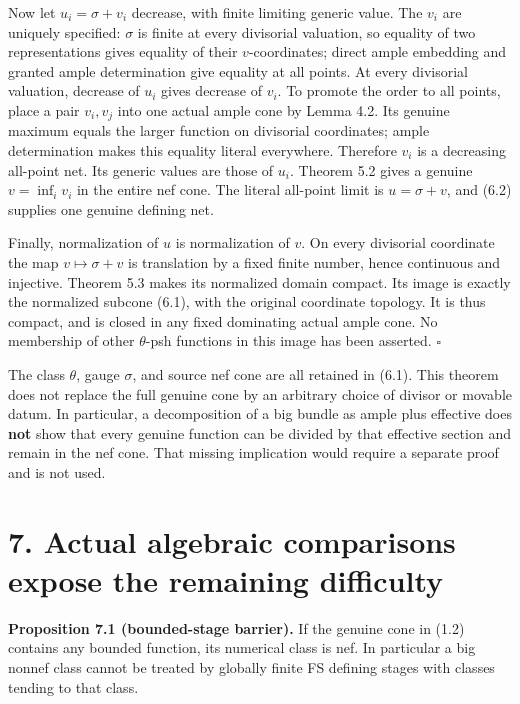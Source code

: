 \documentclass[10pt]{article}
\begin{document}
Now let \(u_i=\sigma+v_i\) decrease, with finite limiting generic value.
The \(v_i\) are uniquely specified: \(\sigma\) is finite at every
divisorial valuation, so equality of two representations gives equality
of their \(v\)-coordinates; direct ample embedding and granted ample
determination give equality at all points. At every divisorial
valuation, decrease of \(u_i\) gives decrease of \(v_i\). To promote the
order to all points, place a pair \(v_i,v_j\) into one actual ample cone
by Lemma 4.2. Its genuine maximum equals the larger function on
divisorial coordinates; ample determination makes this equality literal
everywhere. Therefore \(v_i\) is a decreasing all-point net. Its generic
values are those of \(u_i\). Theorem 5.2 gives a genuine
\(v=\inf_i v_i\) in the entire nef cone. The literal all-point limit is
\(u=\sigma+v\), and (6.2) supplies one genuine defining net.

Finally, normalization of \(u\) is normalization of \(v\). On every
divisorial coordinate the map \(v\mapsto\sigma+v\) is translation by a
fixed finite number, hence continuous and injective. Theorem 5.3 makes
its normalized domain compact. Its image is exactly the normalized
subcone (6.1), with the original coordinate topology. It is thus
compact, and is closed in any fixed dominating actual ample cone. No
membership of other \(\theta\)-psh functions in this image has been
asserted. \(\square\)

The class \(\theta\), gauge \(\sigma\), and source nef cone are all
retained in (6.1). This theorem does not replace the full genuine cone
by an arbitrary choice of divisor or movable datum. In particular, a
decomposition of a big bundle as ample plus effective does \textbf{not}
show that every genuine function can be divided by that effective
section and remain in the nef cone. That missing implication would
require a separate proof and is not used.

\section{7. Actual algebraic comparisons expose the remaining
difficulty}\label{actual-algebraic-comparisons-expose-the-remaining-difficulty}

\textbf{Proposition 7.1 (bounded-stage barrier).} If the genuine cone in
(1.2) contains any bounded function, its numerical class is nef. In
particular a big nonnef class cannot be treated by globally finite FS
defining stages with classes tending to that class.
\end{document}
